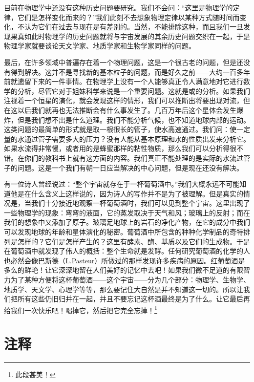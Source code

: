 \documentclass[12pt,oneside]{book}
\begin{document}
\begin{common-format}
目前在物理学中还没有这种历史问题要研究。我们不会问：“这里是物理学的定律，它们是怎样变化而来的？”我们此刻不去想象物理定律以某种方式随时间而变化，不认为它们在过去与现在是有差别的。当然，不能排除这种，而且我们一旦发现果真如此时物理学的历史问题就将与宇宙发展的其余历史问题交织在一起，于是物理学家就要谈论天文学家、地质学家和生物学家同样的问题。

最后，在许多领域中普遍存在着一个物理问题，这是一个很古老的问题，但是还没有得到解决。这并不是寻找新的基本粒子的问题，而是好久之前——大约一百多年前就遗留下来的一件事情。在物理学上没有一个人能够真正令人满意地对它进行数学的分析，尽管它对于姐妹科学来说是一个重要问题。这就是或的分析。如果我们注视着一个恒星的演化，就会发现这样的情形，我们可以推断出将要出现对流，但在这以后我们就再也无法推断会有什么事发生了。几百万年后这个星体会发生爆炸，但是我们想不出是什么道理。我们不能分析气候，也不知道地球内部的运动。这类问题的最简单的形式就是取一根很长的管子，使水高速通过。我们问：使一定量的水通过管子需要多大的压力？没有人能从基本原理和水的性质出发来分析它。如果水流得非常慢，或者用的是蜂蜜那样的粘性物质，那么我们可以分析得很不错。在你们的教科书上就有这方面的内容。我们真正不能处理的是实际的水流过管子的问题。这是一个我们有朝一日应当解决的中心问题，但是现在还没有解决。

有一位诗人曾经说过：“整个宇宙就存在于一杯葡萄酒中。”我们大概永远不可能知道他是在什么含义上这样说的，因为诗人的写作并不是为了被理解。但是真实的情况是，当我们十分接近地观察一杯葡萄酒时，我们可以见到整个宁宙。这里出现了一些物理学的现象：弯弯的液面，它的蒸发取决于天气和风；玻璃上的反射；而在我们的想象中又添加了原子。玻璃足地球上的岩石的净化产物，在它的成分中我们可以发现地球的年龄和星体演化的秘密。葡萄酒中所包含的种种化学制品的奇特排列是怎样的？它们是怎样产生的？这里有酵素、酶、基质以及它们的生成物。于是在葡萄酒中就发现了伟人的概括：整个生命就是发酵。任何研究葡萄酒的化学的人也必然会像巴斯德（L.Pasteur）所做过的那样发现许多疾病的原因。红葡萄酒是多么的鲜艳！让它深深地留在人们美好的记忆中去吧！如果我们微不足道的有限智力为了某种方便将这杯葡萄酒——这个宇宙——分为几个部分：物理学、生物学、地质学、天文学、心理学等等，那么要记住大自然是并不知道这一切的。所以让我们把所有这些仍旧归并在一起，并且不要忘记这杯酒最终是为了什么。让它最后再给我们一次快乐吧！喝掉它，然后把它完全忘掉！\footnote{此段甚美！}

\section{注释}
\showendnotes




\end{common-format}
\end{document}
